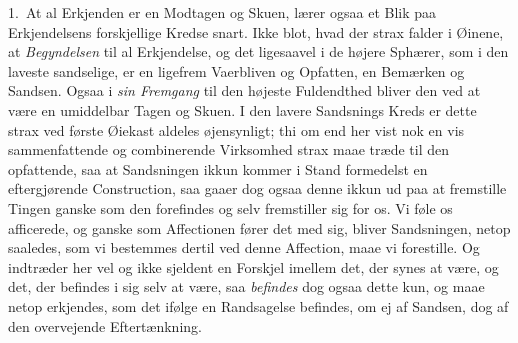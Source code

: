 \documentclass[12pt,a4paper]{book}
\newcommand{\apage}[1]{\marginnote{\footnotesize\textit{[#1]}}}
\begin{document}
1.~At al Erkjenden er en Modtagen og Skuen, lærer ogsaa et Blik paa
Erkjendelsens forskjellige Kredse snart. Ikke blot, hvad der strax falder i  \apage{5}
Øinene, at \emph{Begyndelsen} til al Erkjendelse, og det ligesaavel i de højere
Sphærer, som i den laveste sandselige, er en ligefrem Vaerbliven og Opfatten,
en Bemærken og Sandsen. Ogsaa i \emph{sin Fremgang} til den højeste Fuldendthed bliver
den ved at være en umiddelbar Tagen og Skuen. I den lavere Sandsnings Kreds er
dette strax ved første Øiekast aldeles øjensynligt; thi om end her vist nok en
vis sammenfattende og combinerende Virksomhed strax maae træde til den
opfattende, saa at Sandsningen ikkun kommer i Stand formedelst en eftergjørende
Construction, saa gaaer dog ogsaa denne ikkun ud paa at fremstille Tingen ganske
som den forefindes og selv fremstiller sig for os. Vi føle os afficerede, og
ganske som Affectionen fører det med sig, bliver Sandsningen, netop saaledes,
som vi bestemmes dertil ved denne Affection, maae vi forestille. Og indtræder
her vel og ikke sjeldent en Forskjel imellem det, der synes at være, og det,
der befindes i sig selv at være, saa \emph{befindes} dog ogsaa dette kun, og maae netop
erkjendes, som det ifølge en Randsagelse befindes, om ej af Sandsen, dog af den
overvejende Eftertænkning.
\end{document}
